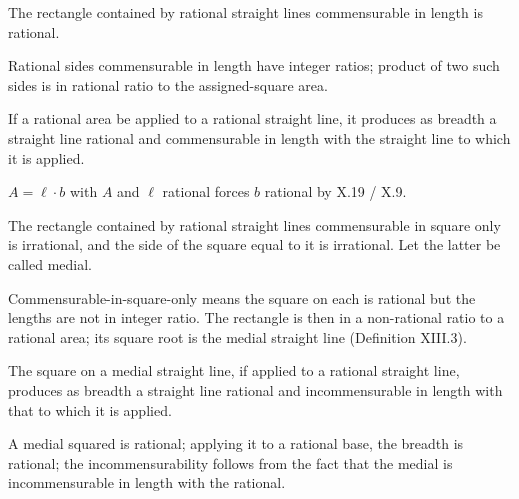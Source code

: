 \documentclass{rrxiv}
\begin{document}
\begin{claim}
\label{prop:X.19}
The rectangle contained by rational straight lines commensurable in
length is rational.
\end{claim}
\begin{evidence}[Proof of X.19]
\label{ev:X.19}
Rational sides commensurable in length have integer ratios; product
of two such sides is in rational ratio to the assigned-square area.
\end{evidence}

\begin{claim}
\label{prop:X.20}
If a rational area be applied to a rational straight line, it produces
as breadth a straight line rational and commensurable in length with
the straight line to which it is applied.
\end{claim}
\begin{evidence}[Proof of X.20]
\label{ev:X.20}
$A = \ell \cdot b$ with $A$ and $\ell$ rational forces $b$ rational by
X.19 / X.9.
\end{evidence}

\begin{claim}
\label{prop:X.21}
The rectangle contained by rational straight lines commensurable in
square only is irrational, and the side of the square equal to it is
irrational.  Let the latter be called medial.
\end{claim}
\begin{evidence}[Proof of X.21]
\label{ev:X.21}
Commensurable-in-square-only means the square on each is rational
but the lengths are not in integer ratio.  The rectangle is then in
a non-rational ratio to a rational area; its square root is the
medial straight line (Definition XIII.3).
\end{evidence}

\begin{claim}
\label{prop:X.22}
The square on a medial straight line, if applied to a rational
straight line, produces as breadth a straight line rational and
incommensurable in length with that to which it is applied.
\end{claim}
\begin{evidence}[Proof of X.22]
\label{ev:X.22}
A medial squared is rational; applying it to a rational base, the
breadth is rational; the incommensurability follows from the fact
that the medial is incommensurable in length with the rational.
\end{evidence}
\end{document}
